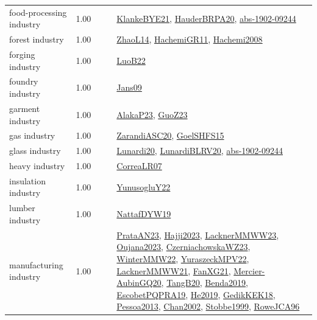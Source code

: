 {\begin{longtable}{p{3cm}r>{\raggedright\arraybackslash}p{6cm}>{\raggedright\arraybackslash}p{6cm}>{\raggedright\arraybackslash}p{8cm}}
\index{food-processing industry}\index{Industries!food-processing industry}food-processing industry &  1.00 &  &  & \hyperref[detail:KlankeBYE21]{KlankeBYE21}, \hyperref[detail:HauderBRPA20]{HauderBRPA20}, \hyperref[detail:abs-1902-09244]{abs-1902-09244}\\
\index{forest industry}\index{Industries!forest industry}forest industry &  1.00 &  &  & \hyperref[detail:ZhaoL14]{ZhaoL14}, \hyperref[detail:HachemiGR11]{HachemiGR11}, \hyperref[detail:Hachemi2008]{Hachemi2008}\\
\index{forging industry}\index{Industries!forging industry}forging industry &  1.00 &  &  & \hyperref[detail:LuoB22]{LuoB22}\\
\index{foundry industry}\index{Industries!foundry industry}foundry industry &  1.00 &  &  & \hyperref[detail:Jans09]{Jans09}\\
\index{garment industry}\index{Industries!garment industry}garment industry &  1.00 &  &  & \hyperref[detail:AlakaP23]{AlakaP23}, \hyperref[detail:GuoZ23]{GuoZ23}\\
\index{gas industry}\index{Industries!gas industry}gas industry &  1.00 &  &  & \hyperref[detail:ZarandiASC20]{ZarandiASC20}, \hyperref[detail:GoelSHFS15]{GoelSHFS15}\\
\index{glass industry}\index{Industries!glass industry}glass industry &  1.00 &  &  & \hyperref[detail:Lunardi20]{Lunardi20}, \hyperref[detail:LunardiBLRV20]{LunardiBLRV20}, \hyperref[detail:abs-1902-09244]{abs-1902-09244}\\
\index{heavy industry}\index{Industries!heavy industry}heavy industry &  1.00 &  &  & \hyperref[detail:CorreaLR07]{CorreaLR07}\\
\index{insulation industry}\index{Industries!insulation industry}insulation industry &  1.00 &  &  & \hyperref[detail:YunusogluY22]{YunusogluY22}\\
\index{lumber industry}\index{Industries!lumber industry}lumber industry &  1.00 &  &  & \hyperref[detail:NattafDYW19]{NattafDYW19}\\
\index{manufacturing industry}\index{Industries!manufacturing industry}manufacturing industry &  1.00 &  &  & \hyperref[detail:PrataAN23]{PrataAN23}, \hyperref[detail:Hajji2023]{Hajji2023}, \hyperref[detail:LacknerMMWW23]{LacknerMMWW23}, \hyperref[detail:Oujana2023]{Oujana2023}, \hyperref[detail:CzerniachowskaWZ23]{CzerniachowskaWZ23}, \hyperref[detail:WinterMMW22]{WinterMMW22}, \hyperref[detail:YuraszeckMPV22]{YuraszeckMPV22}, \hyperref[detail:LacknerMMWW21]{LacknerMMWW21}, \hyperref[detail:FanXG21]{FanXG21}, \hyperref[detail:Mercier-AubinGQ20]{Mercier-AubinGQ20}, \hyperref[detail:TangB20]{TangB20}, \hyperref[detail:Benda2019]{Benda2019}, \hyperref[detail:EscobetPQPRA19]{EscobetPQPRA19}, \hyperref[detail:He2019]{He2019}, \hyperref[detail:GedikKEK18]{GedikKEK18}, \hyperref[detail:Pessoa2013]{Pessoa2013}, \hyperref[detail:Chan2002]{Chan2002}, \hyperref[detail:Stobbe1999]{Stobbe1999}, \hyperref[detail:RoweJCA96]{RoweJCA96}\\

\end{longtable}}
